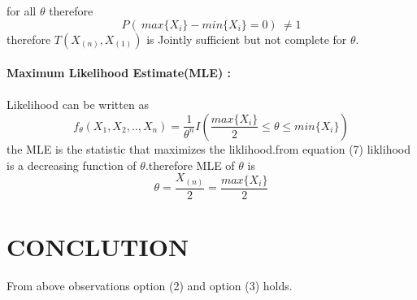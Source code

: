 \documentclass[journal,12pt,twocolumn]{IEEEtran}
\begin{document}
for all $\theta$ therefore 
\begin{equation}
    P(\ max\{X_i\}-min\{X_i\}=0 )\ \neq1
\end{equation}
therefore $T(X_{(n)},X_{(1)})$ is Jointly sufficient but not complete for $\theta$. \\ \\
\textbf{Maximum Likelihood Estimate(MLE) :}\\ \\
Likelihood can be written as 
\begin{equation}
    f_\theta(X_1,X_2,..,X_n)=\frac{1}{\theta^n}I\left( \frac{max     \{X_i\}}{2}\leq\theta\leq min\{X_i\}\right)
\end{equation}
the MLE is the statistic that maximizes the liklihood.from equation (7) liklihood is a decreasing function of $\theta$.therefore MLE of $\theta$ is 
\begin{equation}
    \theta=\frac{X_{(n)}}{2}=\frac{max\{X_i\}}{2}
\end{equation}
\section{\textbf{CONCLUTION}}
From above observations option (2) and option (3) holds.
\end{document}
